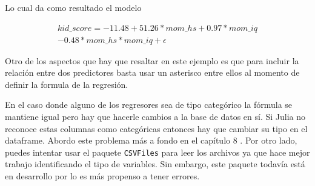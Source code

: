 Lo cual da como resultado el modelo 

\begin{equation*}
    \begin{aligned}
        kid\_score = -11.48 + 51.26* mom\_hs + 0.97*mom\_iq \\
        -0.48*mom\_hs*mom\_iq + \epsilon
    \end{aligned}
\end{equation*}

Otro de los aspectos que hay que resaltar en este ejemplo es que para incluir la relación entre dos predictores basta usar un asterisco entre ellos al momento de definir la formula de la regresión. 

En el caso donde alguno de los regresores sea de tipo categórico la fórmula se mantiene igual pero hay que hacerle cambios a la base de datos en sí. Si Julia no reconoce estas columnas como categóricas entonces hay que cambiar su tipo en el dataframe. Abordo este problema más a fondo en el capítulo 8 . Por otro lado, puedes intentar usar el paquete \texttt{CSVFiles} para leer los archivos ya que hace mejor trabajo identificando el tipo de variables. Sin embargo, este paquete todavía está en desarrollo por lo es más propenso a tener errores. 
